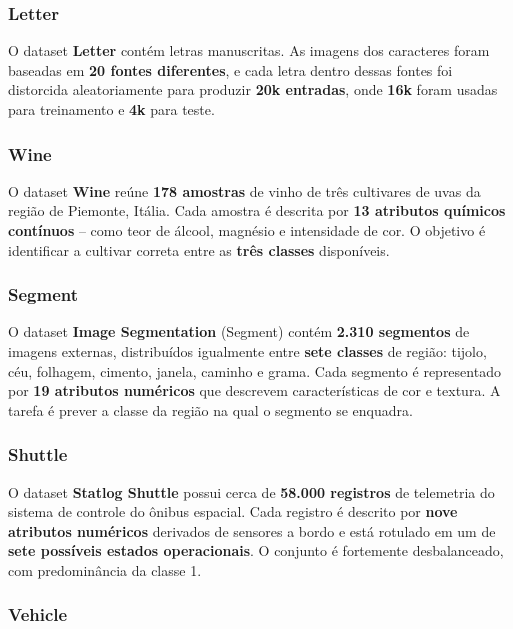 \documentclass{article}
\begin{document}
\subsubsection{Letter}

O dataset \textbf{Letter} contém letras manuscritas. As imagens dos caracteres foram baseadas em \textbf{20 fontes diferentes}, e cada letra dentro dessas fontes foi distorcida aleatoriamente para produzir \textbf{20k entradas}, onde \textbf{16k} foram usadas para treinamento e \textbf{4k} para teste.

\subsubsection{Wine}

O dataset \textbf{Wine} reúne \textbf{178 amostras} de vinho de três cultivares de uvas da região de Piemonte, Itália. Cada amostra é descrita por \textbf{13 atributos químicos contínuos} – como teor de álcool, magnésio e intensidade de cor. O objetivo é identificar a cultivar correta entre as \textbf{três classes} disponíveis.

\subsubsection{Segment}

O dataset \textbf{Image Segmentation} (Segment) contém \textbf{2.310 segmentos} de imagens externas, distribuídos igualmente entre \textbf{sete classes} de região: tijolo, céu, folhagem, cimento, janela, caminho e grama. Cada segmento é representado por \textbf{19 atributos numéricos} que descrevem características de cor e textura. A tarefa é prever a classe da região na qual o segmento se enquadra.

\subsubsection{Shuttle}

O dataset \textbf{Statlog Shuttle} possui cerca de \textbf{58.000 registros} de telemetria do sistema de controle do ônibus espacial. Cada registro é descrito por \textbf{nove atributos numéricos} derivados de sensores a bordo e está rotulado em um de \textbf{sete possíveis estados operacionais}. O conjunto é fortemente desbalanceado, com predominância da classe 1.

\subsubsection{Vehicle}
\end{document}

